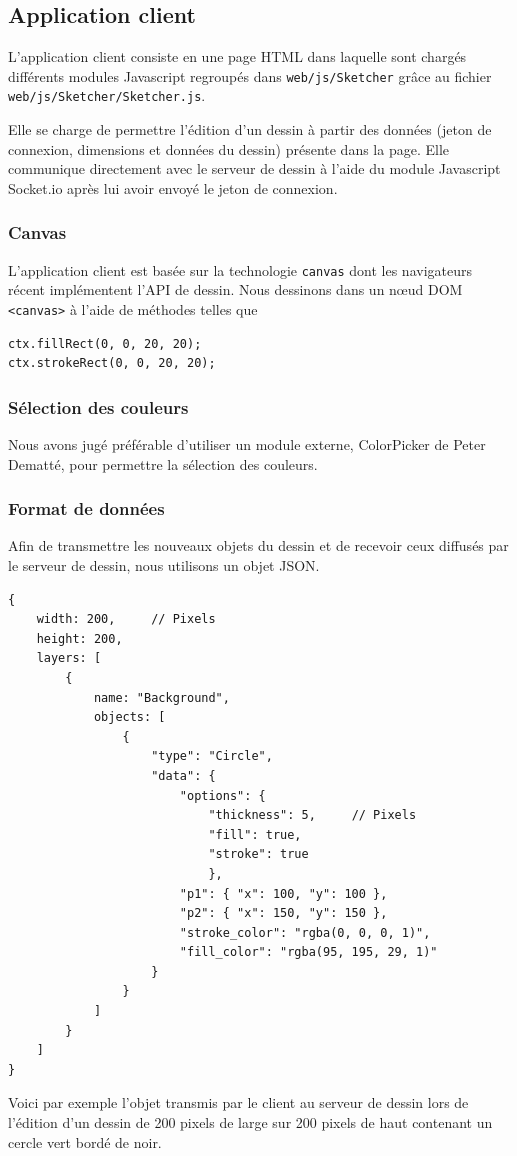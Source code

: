 \documentclass[a4paper]{article}
\begin{document}
\subsection{Application client}
L'application client consiste en une page HTML dans laquelle sont chargés différents modules Javascript regroupés dans \texttt{web/js/Sketcher} grâce au fichier \texttt{web/js/Sketcher/Sketcher.js}.

Elle se charge de permettre l'édition d'un dessin à partir des données (jeton de connexion, dimensions et données du dessin) présente dans la page. Elle communique directement avec le serveur de dessin à l'aide du module Javascript Socket.io après lui avoir envoyé le jeton de connexion.

\subsubsection{Canvas}
L'application client est basée sur la technologie \texttt{canvas} dont les navigateurs récent implémentent l'API de dessin. Nous dessinons dans un nœud DOM \texttt{<canvas>} à l'aide de méthodes telles que
\begin{lstlisting}
ctx.fillRect(0, 0, 20, 20);
ctx.strokeRect(0, 0, 20, 20);
\end{lstlisting}

\subsubsection{Sélection des couleurs}
Nous avons jugé préférable d'utiliser un module externe, \cite{ColorPicker}ColorPicker de Peter Dematté, pour permettre la sélection des couleurs.

\subsubsection{Format de données}
Afin de transmettre les nouveaux objets du dessin et de recevoir ceux diffusés par le serveur de dessin, nous utilisons un objet JSON.
\begin{lstlisting}
{
	width: 200,		// Pixels
	height: 200,
	layers: [
		{
			name: "Background",
			objects: [
				{
					"type": "Circle",
					"data": {
						"options": {
							"thickness": 5,		// Pixels
							"fill": true,
							"stroke": true
							},
						"p1": { "x": 100, "y": 100 },
						"p2": { "x": 150, "y": 150 },
						"stroke_color": "rgba(0, 0, 0, 1)",
						"fill_color": "rgba(95, 195, 29, 1)"
					}
				}
			]
		}
	]
}
\end{lstlisting}
Voici par exemple l'objet transmis par le client au serveur de dessin lors de l'édition d'un dessin de 200 pixels de large sur 200 pixels de haut contenant un cercle vert bordé de noir.
\end{document}
